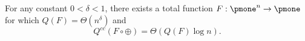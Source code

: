 \setcounter{theorem}{2}
\begin{theorem}\label{thm: extmain}
For any constant $0 < \delta < 1$, there exists a total function $F : \pmone^n \to \pmone$ for which $Q(F) = \Theta(n^{\delta})$ and 
\[
Q^{cc}(F \circ \oplus) = \Theta(Q(F) \log n).
\]
\end{theorem}

